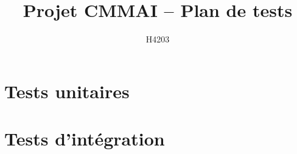 \documentclass[11pt, a4paper]{article}
\title{Projet CMMAI -- Plan de tests}
\author{H4203}
\date{}
\begin{document}
\maketitle
\tableofcontents

\part{Tests unitaires}





\newpage
\part{Tests d'intégration}
\setcounter{testno}{0}

\end{document}
